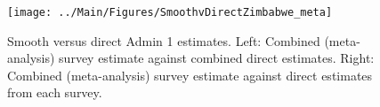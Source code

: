 \documentclass[12pt]{article}\usepackage[]{graphicx}\usepackage[]{color}
\newenvironment{knitrout}{}{} %
\begin{document}



\begin{knitrout}
\color{fgcolor}\begin{figure}[bht]

{\centering \texttt{[image: ../Main/Figures/SmoothvDirectZimbabwe\_meta]} 

}

\caption[Smooth versus direct Admin 1 estimates]{Smooth versus direct Admin 1 estimates. Left: Combined (meta-analysis) survey estimate against combined direct estimates. Right: Combined (meta-analysis) survey estimate against direct estimates from each survey.}\label{fig:unnamed-chunk-343}
\end{figure}


\end{knitrout}
\end{document}
